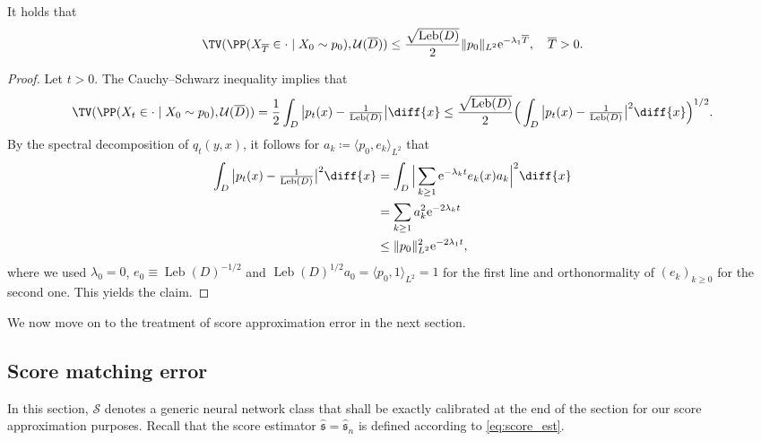\documentclass[a4paper, 11pt, headings = small, abstract]{scrartcl}
\begin{document}
\begin{lemma} \label{lem:ergodic_err}
It holds that
\[\TV(\PP(X_{\overline{T}} \in \cdot \mid X_0 \sim p_0), \mathcal{U}(\overline{D})) \leq \frac{\sqrt{\operatorname{Leb}(D)}}{2} \lVert p_0 \rVert_{L^2} \mathrm{e}^{-\lambda_1 \overline{T}}, \quad \overline{T} > 0.\]
\end{lemma}
\begin{proof} 
Let $t > 0$. 
The Cauchy--Schwarz inequality implies that
\[\TV(\PP(X_t \in \cdot \mid X_0 \sim p_0), \mathcal{U}(\overline{D})) = \frac{1}{2} \int_D \big\lvert p_t(x) - \tfrac{1}{\operatorname{Leb}(D)} \big\rvert \diff{x} \leq \frac{\sqrt{\operatorname{Leb}(D)}}{2} \Big( \int_D \big\lvert p_t(x) - \tfrac{1}{\operatorname{Leb}(D)} \big\rvert^2 \diff{x} \Big)^{1/2}.\]
By the spectral decomposition of $q_t(y,x)$, it follows for $a_k \coloneqq \langle p_0,e_k\rangle_{L^2}$ that
\begin{align*} 
\int_D \big\lvert p_t(x) - \tfrac{1}{\operatorname{Leb}(D)}\big\rvert^2 \diff{x} &= \int_D \Big\lvert \sum_{k \geq 1} \mathrm{e}^{-\lambda_k t} e_k(x) a_k \Big\rvert^2 \diff{x} \\ 
&= \sum_{k\geq 1} a_k^2 \mathrm{e}^{-2\lambda_k t}\\ 
&\leq \lVert p_0 \rVert_{L^2}^2 \mathrm{e}^{-2\lambda_1 t},
\end{align*}
where we used $\lambda_0 = 0$, $e_0 \equiv \operatorname{Leb}(D)^{-1/2}$ and $\operatorname{Leb}(D)^{1/2}a_0 = \langle p_0, 1\rangle_{L^2}  = 1$ for the first line and orthonormality of $(e_k)_{k \geq 0}$ for the second one. This yields the claim.
\end{proof}
We now move on to the treatment of score approximation error in the next section.


\subsection{Score matching error}\label{subsec:score_match}
In this section, $\mathcal{S}$ denotes a generic neural network class that shall be exactly calibrated at the end of the section for our score approximation purposes. Recall that the score estimator $\hat{\mathfrak{s}} = \hat{\mathfrak{s}}_n$ is defined according to \eqref{eq:score_est}. 
\end{document}
